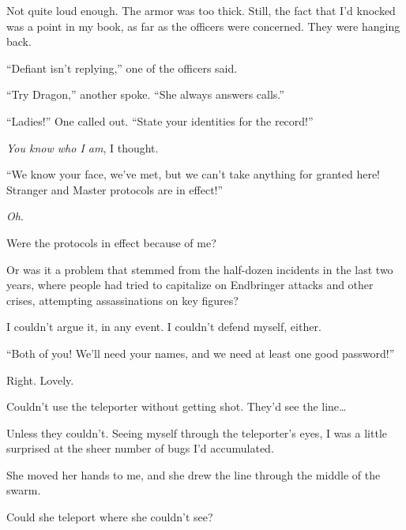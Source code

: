 Not quite loud enough.  The armor was too thick.  Still, the fact that I'd knocked was a point in my book, as far as the officers were concerned.  They were hanging back.



``Defiant isn't replying,'' one of the officers said.



``Try Dragon,'' another spoke.  ``She always answers calls.''



``Ladies!''  One called out.  ``State your identities for the record!''



\emph{You know who I am}, I thought.



``We know your face, we've met, but we can't take anything for granted here!  Stranger and Master protocols are in effect!''



\emph{Oh}.



Were the protocols in effect because of me?



Or was it a problem that stemmed from the half-dozen incidents in the last two years, where people had tried to capitalize on Endbringer attacks and other crises, attempting assassinations on key figures?



I couldn't argue it, in any event.  I couldn't defend myself, either.



``Both of you!  We'll need your names, and we need at least one good password!''



Right.  Lovely.



Couldn't use the teleporter without getting shot.  They'd see the line\ldots



Unless they couldn't.  Seeing myself through the teleporter's eyes, I was a little surprised at the sheer number of bugs I'd accumulated.



She moved her hands to me, and she drew the line through the middle of the swarm.



Could she teleport where she couldn't see?



